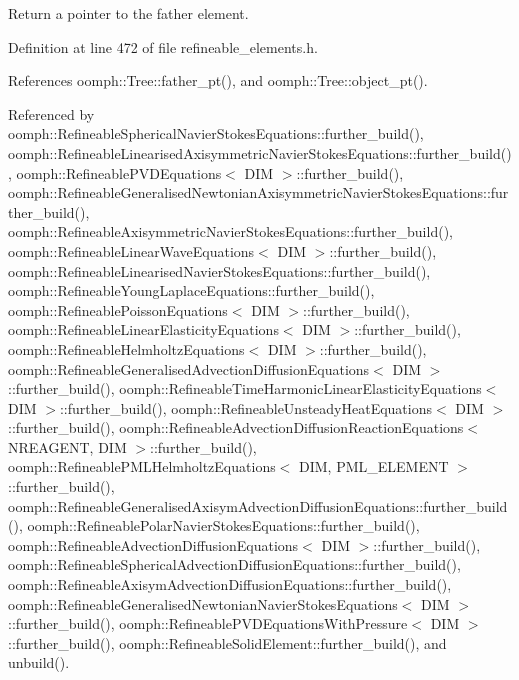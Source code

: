 Return a pointer to the father element. 



Definition at line 472 of file refineable\+\_\+elements.\+h.



References oomph\+::\+Tree\+::father\+\_\+pt(), and oomph\+::\+Tree\+::object\+\_\+pt().



Referenced by oomph\+::\+Refineable\+Spherical\+Navier\+Stokes\+Equations\+::further\+\_\+build(), oomph\+::\+Refineable\+Linearised\+Axisymmetric\+Navier\+Stokes\+Equations\+::further\+\_\+build(), oomph\+::\+Refineable\+P\+V\+D\+Equations$<$ D\+I\+M $>$\+::further\+\_\+build(), oomph\+::\+Refineable\+Generalised\+Newtonian\+Axisymmetric\+Navier\+Stokes\+Equations\+::further\+\_\+build(), oomph\+::\+Refineable\+Axisymmetric\+Navier\+Stokes\+Equations\+::further\+\_\+build(), oomph\+::\+Refineable\+Linear\+Wave\+Equations$<$ D\+I\+M $>$\+::further\+\_\+build(), oomph\+::\+Refineable\+Linearised\+Navier\+Stokes\+Equations\+::further\+\_\+build(), oomph\+::\+Refineable\+Young\+Laplace\+Equations\+::further\+\_\+build(), oomph\+::\+Refineable\+Poisson\+Equations$<$ D\+I\+M $>$\+::further\+\_\+build(), oomph\+::\+Refineable\+Linear\+Elasticity\+Equations$<$ D\+I\+M $>$\+::further\+\_\+build(), oomph\+::\+Refineable\+Helmholtz\+Equations$<$ D\+I\+M $>$\+::further\+\_\+build(), oomph\+::\+Refineable\+Generalised\+Advection\+Diffusion\+Equations$<$ D\+I\+M $>$\+::further\+\_\+build(), oomph\+::\+Refineable\+Time\+Harmonic\+Linear\+Elasticity\+Equations$<$ D\+I\+M $>$\+::further\+\_\+build(), oomph\+::\+Refineable\+Unsteady\+Heat\+Equations$<$ D\+I\+M $>$\+::further\+\_\+build(), oomph\+::\+Refineable\+Advection\+Diffusion\+Reaction\+Equations$<$ N\+R\+E\+A\+G\+E\+N\+T, D\+I\+M $>$\+::further\+\_\+build(), oomph\+::\+Refineable\+P\+M\+L\+Helmholtz\+Equations$<$ D\+I\+M, P\+M\+L\+\_\+\+E\+L\+E\+M\+E\+N\+T $>$\+::further\+\_\+build(), oomph\+::\+Refineable\+Generalised\+Axisym\+Advection\+Diffusion\+Equations\+::further\+\_\+build(), oomph\+::\+Refineable\+Polar\+Navier\+Stokes\+Equations\+::further\+\_\+build(), oomph\+::\+Refineable\+Advection\+Diffusion\+Equations$<$ D\+I\+M $>$\+::further\+\_\+build(), oomph\+::\+Refineable\+Spherical\+Advection\+Diffusion\+Equations\+::further\+\_\+build(), oomph\+::\+Refineable\+Axisym\+Advection\+Diffusion\+Equations\+::further\+\_\+build(), oomph\+::\+Refineable\+Generalised\+Newtonian\+Navier\+Stokes\+Equations$<$ D\+I\+M $>$\+::further\+\_\+build(), oomph\+::\+Refineable\+P\+V\+D\+Equations\+With\+Pressure$<$ D\+I\+M $>$\+::further\+\_\+build(), oomph\+::\+Refineable\+Solid\+Element\+::further\+\_\+build(), and unbuild().

